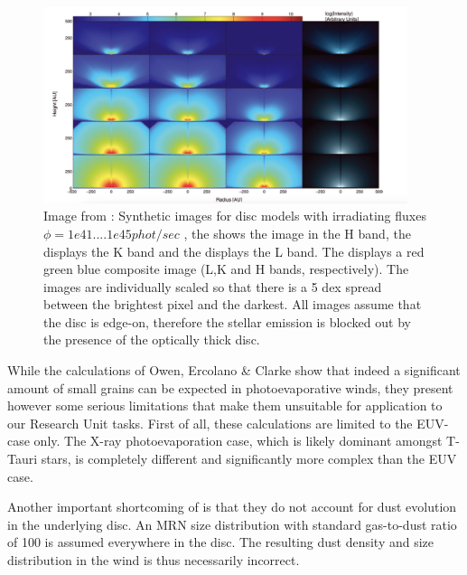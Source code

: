\documentclass[10pt,fleqn,twoside]{article}
\begin{document}
\begin{figure}
  \includegraphics[width=0.95\textwidth]{wingnut.pdf}
  \caption{Image from \citet{2011MNRAS.411.1104O}: Synthetic images for
    disc models with irradiating fluxes $\phi = 1e41.... 1e45 phot/sec$ ,
    the  shows the image in the H band,
    the  displays the K band and the
     displays the L band. The
     displays a red green blue
    composite image (L,K and H bands, respectively). The images are
    individually scaled so that there is a 5 dex spread between the
    brightest pixel and the darkest. All images assume that the disc is
    edge-on, therefore the stellar emission is blocked out by the presence
    of the optically thick disc.}
  \label{fig:maps}
\end{figure}

While the calculations of Owen, Ercolano \& Clarke show that indeed a
significant amount of small grains can be expected in photoevaporative
winds, they present however
some serious limitations that make them unsuitable for application to our Research
Unit tasks. 
First of all, these calculations are limited to the EUV-case only. The
X-ray photoevaporation case, which is likely dominant amongst T-Tauri
stars, is completely different and significantly more complex than the EUV case. 

Another important shortcoming of \citet{2011MNRAS.411.1104O} is
that they do not account for dust evolution in the underlying disc. An
MRN \citep{1977ApJ...217..425M} size distribution with standard gas-to-dust ratio of 100 is
assumed everywhere in the disc. The resulting dust density and size
distribution in the wind is thus necessarily incorrect. 
\end{document}
